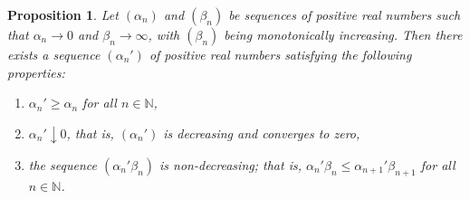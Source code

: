 \documentclass[10pt]{amsart}
\newtheorem{prop}[thm]{Proposition}
\theoremstyle{definition}
\theoremstyle{myremark}
\numberwithin{equation}{section}
\begin{document}
\begin{prop}\label{prop: seq lemma}
    Let $(\alpha_n)$ and $(\beta_n)$ be sequences of positive real numbers such that $\alpha_n \to 0$ and $\beta_n \to \infty$, with $(\beta_n)$ being monotonically increasing. Then there exists a sequence $(\alpha_n')$ of positive real numbers satisfying the following properties:
\begin{enumerate}
    \item $\alpha_n' \geq \alpha_n$ for all $n \in \mathbb{N}$,
    \item $\alpha_n' \downarrow 0$, that is, $(\alpha_n')$ is decreasing and converges to zero,
    \item the sequence $(\alpha_n' \beta_n)$ is non-decreasing; that is, $\alpha_n' \beta_n \leq \alpha_{n+1}' \beta_{n+1}$ for all $n \in \mathbb{N}$.
\end{enumerate}
\end{prop}
\end{document}
